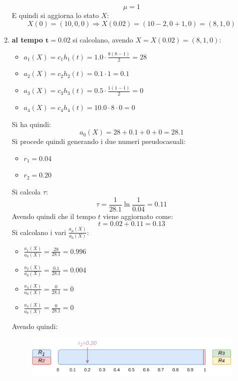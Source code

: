 \documentclass{article}
\begin{document}
\begin{enumerate}[label=\roman*)]
  \[\mu=1\]
  E quindi si aggiorna lo stato $X$:
  \[X(0) = (10,0,0) \Rightarrow X(0.02) = (10-2,0+1,0) = (8,1,0)\]
  \newpage
  \item \textbf{al tempo $\mathbf{t=0.02}$} si calcolano, avendo
  $X=X(0.02)=(8,1,0)$: 
  \begin{multicols}{2}
    \begin{itemize}
      \item $a_1(X)=c_1h_1(t)=1.0\cdot\frac{8(8-1)}{2}=28$
      \item $a_2(X)=c_2h_2(t)=0.1\cdot 1=0.1$
      \item $a_3(X)=c_3h_3(t)=0.5\cdot \frac{1(1-1)}{2}=0$
      \item $a_4(X)=c_4h_4(t)=10.0\cdot 8 \cdot 0=0$
    \end{itemize}
  \end{multicols}
  Si ha quindi:
  \[a_0(X)=28+0.1+0+0=28.1\]
  Si procede quindi generando i due numeri pseudocasuali:
  \begin{multicols}{2}
    \begin{itemize}
      \item $r_1=0.04$
      \item $r_2=0.20$
    \end{itemize}
  \end{multicols}
  Si calcola $\tau$:
  \[\tau=\frac{1}{28.1}\ln\frac{1}{0.04}=0.11\]
  Avendo quindi che il tempo $t$ viene aggiornato come:
  \[t=0.02+0.11=0.13\]
  Si calcolano i vari $\frac{a_\mu(X)}{a_0(X)}$:
  \begin{multicols}{2}
    \begin{itemize}
      \item $\frac{a_1(X)}{a_0(X)}=\frac{28}{28.1}=0.996$
      \item $\frac{a_2(X)}{a_0(X)}=\frac{0.1}{28.1}=0.004$
      \item $\frac{a_3(X)}{a_0(X)}=\frac{0}{28.1}=0$
      \item $\frac{a_4(X)}{a_0(X)}=\frac{0}{28.1}=0$
    \end{itemize}
  \end{multicols}
  Avendo quindi:
  \begin{figure}[H]
    \centering
    \includegraphics[scale = 0.8]{img/t2.pdf}
  \end{figure}

\end{enumerate}
\end{document}

